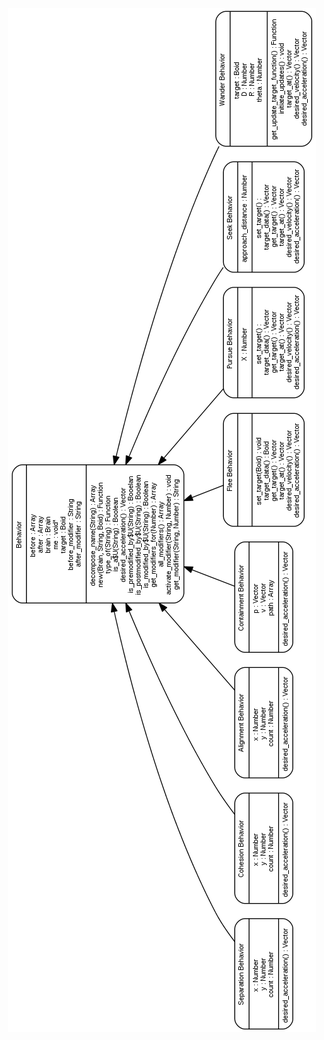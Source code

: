 \begin{figure}[H]
 \centering
 \includegraphics[scale=0.35]{../images/behavior_diagram.png}

 \label{fig:../images/behavior_diagram.png}
\end{figure}

